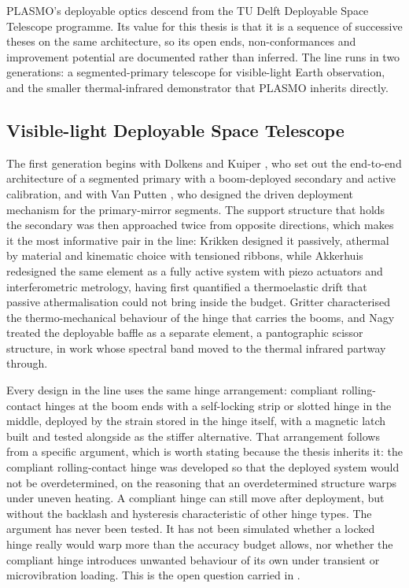 PLASMO's deployable optics descend from the TU Delft Deployable Space Telescope programme. Its value for this thesis is that it is a sequence of successive theses on the same architecture, so its open ends, non-conformances and improvement potential are documented rather than inferred. The line runs in two generations: a segmented-primary telescope for visible-light Earth observation, and the smaller thermal-infrared demonstrator that PLASMO inherits directly.

\subsection{Visible-light Deployable Space Telescope}

The first generation begins with Dolkens and Kuiper \cite{dolkens_deployable_2017}, who set out the end-to-end architecture of a segmented primary with a boom-deployed secondary and active calibration, and with Van Putten \cite{van_putten_design_2017}, who designed the driven deployment mechanism for the primary-mirror segments. The support structure that holds the secondary was then approached twice from opposite directions, which makes it the most informative pair in the line: Krikken \cite{krikken_design_2018} designed it passively, athermal by material and kinematic choice with tensioned ribbons, while Akkerhuis \cite{akkerhuis_deployable_2020} redesigned the same element as a fully active system with piezo actuators and interferometric metrology, having first quantified a thermoelastic drift that passive athermalisation could not bring inside the budget. Gritter \cite{gritter_assessing_2020} characterised the thermo-mechanical behaviour of the hinge that carries the booms, and Nagy \cite{nagy_design_2021} treated the deployable baffle as a separate element, a pantographic scissor structure, in work whose spectral band moved to the thermal infrared partway through.

Every design in the line uses the same hinge arrangement: compliant rolling-contact hinges at the boom ends with a self-locking strip or slotted hinge in the middle, deployed by the strain stored in the hinge itself, with a magnetic latch built and tested alongside as the stiffer alternative. That arrangement follows from a specific argument, which is worth stating because the thesis inherits it: the compliant rolling-contact hinge was developed so that the deployed system would not be overdetermined, on the reasoning that an overdetermined structure warps under uneven heating. A compliant hinge can still move after deployment, but without the backlash and hysteresis characteristic of other hinge types. The argument has never been tested. It has not been simulated whether a locked hinge really would warp more than the accuracy budget allows, nor whether the compliant hinge introduces unwanted behaviour of its own under transient or microvibration loading. This is the open question carried in .

